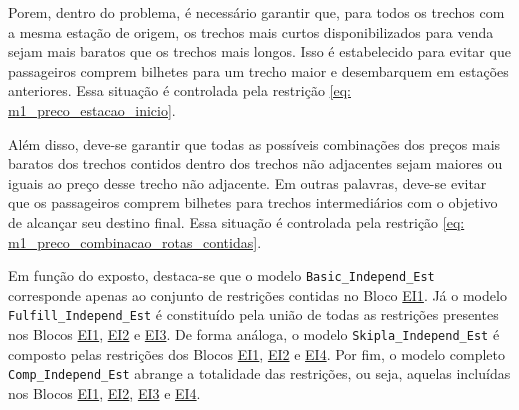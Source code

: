 Porem, dentro do problema, é necessário garantir que, para todos os trechos com a mesma estação de origem, os trechos mais curtos disponibilizados para venda sejam mais baratos que os trechos mais longos. Isso é estabelecido para evitar que passageiros comprem bilhetes para um trecho maior e desembarquem em estações anteriores. Essa situação é controlada pela restrição \eqref{eq: m1_preco_estacao_inicio}.

Além disso, deve-se garantir que todas as possíveis combinações dos preços mais baratos dos trechos contidos dentro dos trechos não adjacentes sejam maiores ou iguais ao preço desse trecho não adjacente. Em outras palavras, deve-se evitar que os passageiros comprem bilhetes para trechos intermediários com o objetivo de alcançar seu destino final. Essa situação é controlada pela restrição \eqref{eq: m1_preco_combinacao_rotas_contidas}.

Em função do exposto, destaca-se que o modelo \texttt{Basic\_Independ\_Est} corresponde apenas ao conjunto de restrições contidas no Bloco \hyperlink{frase:EI1}{EI1}. Já o modelo \texttt{Fulfill\_Independ\_Est} é constituído pela união de todas as restrições presentes nos Blocos \hyperlink{frase:EI1}{EI1}, \hyperlink{frase:EI2}{EI2} e \hyperlink{frase:EI3}{EI3}. De forma análoga, o modelo \texttt{Skipla\_Independ\_Est} é composto pelas restrições dos Blocos \hyperlink{frase:EI1}{EI1}, \hyperlink{frase:EI2}{EI2} e \hyperlink{frase:EI4}{EI4}. Por fim, o modelo completo \texttt{Comp\_Independ\_Est} abrange a totalidade das restrições, ou seja, aquelas incluídas nos Blocos \hyperlink{frase:EI1}{EI1}, \hyperlink{frase:EI2}{EI2}, \hyperlink{frase:EI3}{EI3} e \hyperlink{frase:EI4}{EI4}.

